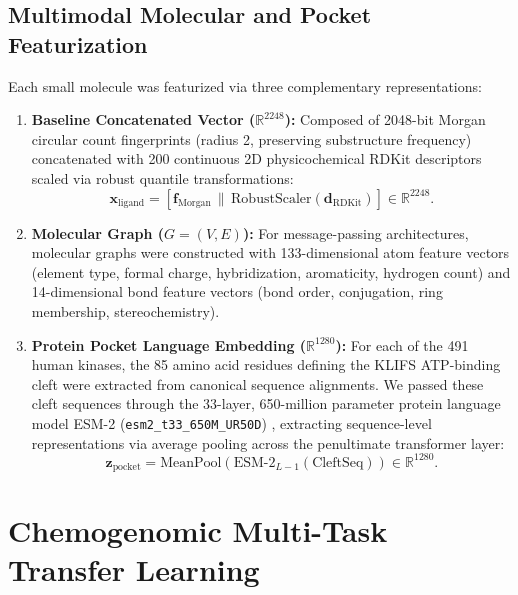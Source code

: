 \documentclass[journal]{IEEEtran}
\begin{document}
\subsection{Multimodal Molecular and Pocket Featurization}
Each small molecule was featurized via three complementary representations:
\begin{enumerate}
    \item \textbf{Baseline Concatenated Vector ($\mathbb{R}^{2248}$):} Composed of 2048-bit Morgan circular count fingerprints (radius 2, preserving substructure frequency) concatenated with 200 continuous 2D physicochemical RDKit descriptors scaled via robust quantile transformations:
    \begin{equation}
        \mathbf{x}_{\text{ligand}} = [\mathbf{f}_{\text{Morgan}} \,\|\, \text{RobustScaler}(\mathbf{d}_{\text{RDKit}})] \in \mathbb{R}^{2248}.
    \end{equation}
    \item \textbf{Molecular Graph ($G = (V, E)$):} For message-passing architectures, molecular graphs were constructed with 133-dimensional atom feature vectors (element type, formal charge, hybridization, aromaticity, hydrogen count) and 14-dimensional bond feature vectors (bond order, conjugation, ring membership, stereochemistry).
    \item \textbf{Protein Pocket Language Embedding ($\mathbb{R}^{1280}$):} For each of the 491 human kinases, the 85 amino acid residues defining the KLIFS ATP-binding cleft were extracted from canonical sequence alignments. We passed these cleft sequences through the 33-layer, 650-million parameter protein language model ESM-2 (\texttt{esm2\_t33\_650M\_UR50D}) \cite{lin2023evolutionary}, extracting sequence-level representations via average pooling across the penultimate transformer layer:
    \begin{equation}
        \mathbf{z}_{\text{pocket}} = \text{MeanPool}\left(\text{ESM-2}_{L-1}(\text{CleftSeq})\right) \in \mathbb{R}^{1280}.
    \end{equation}
\end{enumerate}

\section{Chemogenomic Multi-Task Transfer Learning}
\end{document}
